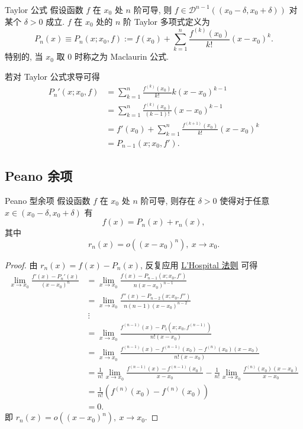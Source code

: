 \documentclass[cn,toc=twocol]{elegantbook}
\newcommand{\D}{\mathscr{D}}
\begin{document}
\begin{definition}{Taylor 公式}
假设函数 $f$ 在 $x_0$ 处 $n$ 阶可导, 则 $f \in \D^{n-1} ((x_0 - \delta, x_0 + \delta))$ 对某个 $\delta >0$ 成立. $f$ 在 $x_0$ 处的 $n$ 阶 Taylor 多项式定义为
\[
	P_n(x) \equiv P_n(x;x_0,f) := f(x_0) + \sum_{k = 1}^n \frac{f^{(k)}(x_0)}{k!} (x - x_0)^k.
\]
特别的, 当 $x_0$ 取 $0$ 时称之为 Maclaurin 公式.
\end{definition}

若对 Taylor 公式求导可得
\[
\begin{aligned}
	P_n'(x; x_0, f) &= \sum_{k = 1}^n \frac{f^{(k)}(x_0)}{k!} k (x - x_0)^{k-1}\\
	&= \sum_{k = 1}^n \frac{f^{(k)}(x_0)}{(k-1)!} (x - x_0)^{k-1}\\
	&= f'(x_0) + \sum_{k = 1}^{n} \frac{f^{(k+1)}(x_0)}{k!} (x - x_0)^{k}\\
	&= P_{n-1}(x; x_0, f').
\end{aligned}
\]

\subsection{Peano 余项}

\begin{theorem}{Peano 型余项}
假设函数 $f$ 在 $x_0$ 处 $n$ 阶可导, 则存在 $\delta > 0$ 使得对于任意 $x \in (x_0 - \delta, x_0 + \delta)$ 有
\[
	f(x) = P_n(x) + r_n(x),
\]
其中
\[
	r_n(x) = o((x - x_0)^n),\ x \to x_0.
\]
\end{theorem}

\begin{proof}
	由 $r_n(x) = f(x) - P_n(x)$, 反复应用 \hyperref[thm:lhospital1]{L'Hospital 法则} 可得
	\[
	\begin{aligned}
		\lim_{x \to x_0} \frac{f'(x) - P_n'(x)}{(x - x_0)^n} &= \lim_{x \to x_0} \frac{f(x) -  P_{n-1}(x; x_0, f')}{n(x - x_0)^{n-1}}\\
		&= \lim_{x \to x_0} \frac{f''(x) -  P_{n-2}(x; x_0, f'')}{n(n-1)(x - x_0)^{n-2}}\\
		&\ \vdots \\
		&= \lim_{x \to x_0} \frac{f^{(n-1)}(x) -  P_{1}(x; x_0, f^{(n-1)})}{n!(x - x_0)}\\
		&= \lim_{x \to x_0} \frac{f^{(n-1)}(x) -  f^{(n-1)}(x_0) - f^{(n)}(x_0) (x - x_0)}{n!(x - x_0)}\\
		&= \frac{1}{n!}\lim_{x \to x_0} \frac{f^{(n-1)}(x) -  f^{(n-1)}(x_0)}{x - x_0} - \frac{1}{n!}\lim_{x \to x_0} \frac{f^{(n)}(x_0) (x - x_0)}{x - x_0}\\
		&= \frac{1}{n!} \left(f^{(n)}(x_0) - f^{(n)}(x_0)\right)\\
		&= 0.
	\end{aligned}
	\]
	即 $r_n(x) = o((x - x_0)^n),\ x \to x_0$.
\end{proof}
\end{document}

